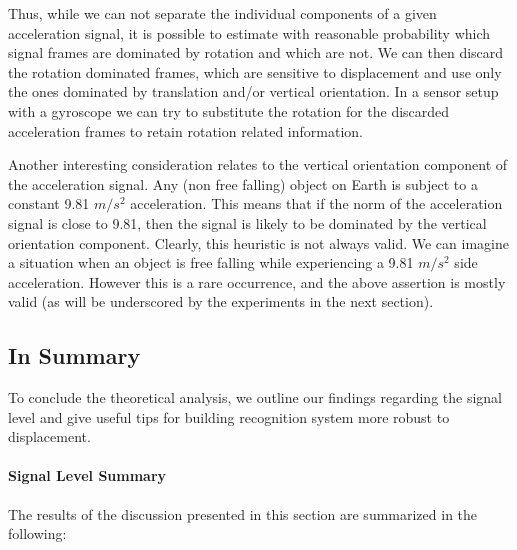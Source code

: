  Thus, while we can not separate the individual
 components of a given acceleration signal, it is possible to estimate
 with reasonable probability which signal frames are dominated by
 rotation and which are not. We can then discard the rotation
 dominated frames, which are sensitive to displacement and use
 only the ones dominated by translation and/or
 vertical orientation.  In a sensor setup with a gyroscope we can
 try to substitute the rotation for the discarded acceleration
 frames to retain rotation related information. 

Another interesting consideration relates to the vertical orientation
component of the acceleration signal. Any (non free falling) object on Earth is
subject to a constant 9.81 $m/s^2$ acceleration. This means that if the norm
of the acceleration signal is close to 9.81, then the signal is likely
to be dominated by the vertical orientation component. Clearly, this heuristic 
is not always valid. We can imagine a
situation when an object is free falling while experiencing a 9.81 $m/s^2$
side acceleration. However this is a rare occurrence, and the above
assertion is mostly valid (as will be
underscored by the experiments in the next section).   

\subsection{In Summary}
To conclude the theoretical analysis, we outline our findings
regarding the signal level and give useful tips for building recognition
system more robust to displacement.

\paragraph{Signal Level Summary}
The results of the discussion presented in this section are summarized in the following: 

